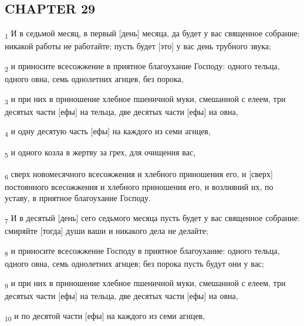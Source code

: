 \subsection{CHAPTER 29}
\begin{tcolorbox}
\textsubscript{1} И в седьмой месяц, в первый [день] месяца, да будет у вас священное собрание; никакой работы не работайте; пусть будет [это] у вас день трубного звука;
\end{tcolorbox}
\begin{tcolorbox}
\textsubscript{2} и приносите всесожжение в приятное благоухание Господу: одного тельца, одного овна, семь однолетних агнцев, без порока,
\end{tcolorbox}
\begin{tcolorbox}
\textsubscript{3} и при них в приношение хлебное пшеничной муки, смешанной с елеем, три десятых части [ефы] на тельца, две десятых части [ефы] на овна,
\end{tcolorbox}
\begin{tcolorbox}
\textsubscript{4} и одну десятую часть [ефы] на каждого из семи агнцев,
\end{tcolorbox}
\begin{tcolorbox}
\textsubscript{5} и одного козла в жертву за грех, для очищения вас,
\end{tcolorbox}
\begin{tcolorbox}
\textsubscript{6} сверх новомесячного всесожжения и хлебного приношения его, и [сверх] постоянного всесожжения и хлебного приношения его, и возлияний их, по уставу, в приятное благоухание Господу.
\end{tcolorbox}
\begin{tcolorbox}
\textsubscript{7} И в десятый [день] сего седьмого месяца пусть будет у вас священное собрание: смиряйте [тогда] души ваши и никакого дела не делайте;
\end{tcolorbox}
\begin{tcolorbox}
\textsubscript{8} и приносите всесожжение Господу в приятное благоухание: одного тельца, одного овна, семь однолетних агнцев; без порока пусть будут они у вас;
\end{tcolorbox}
\begin{tcolorbox}
\textsubscript{9} и при них в приношение хлебное пшеничной муки, смешанной с елеем, три десятых части [ефы] на тельца, две десятых части [ефы] на овна,
\end{tcolorbox}
\begin{tcolorbox}
\textsubscript{10} и по десятой части [ефы] на каждого из семи агнцев,
\end{tcolorbox}
